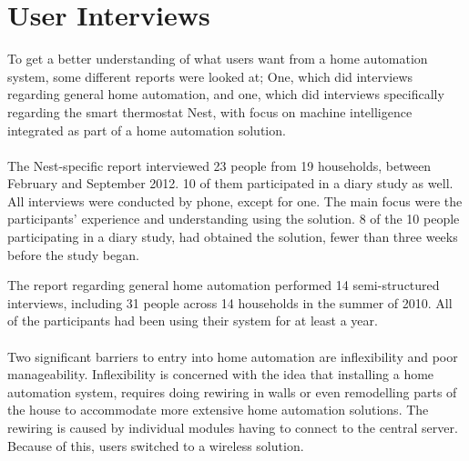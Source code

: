 \section{User Interviews}
\label{sec:interviewReports}
To get a better understanding of what users want from a home automation system, some different reports were looked at; One, which did interviews regarding general home automation\cite{HAInterviews}, and one, which did interviews specifically regarding the smart thermostat Nest, with focus on machine intelligence integrated as part of a home automation solution\cite{AdaptiveInterviews}.
\\\\
The Nest-specific report interviewed 23 people from 19 households, between February and September 2012. 10 of them participated in a diary study as well. All interviews were conducted by phone, except for one. The main focus were the participants' experience and understanding using the solution. 8 of the 10 people participating in a diary study, had obtained the solution, fewer than three weeks before the study began\cite{AdaptiveInterviews}.

The report regarding general home automation performed 14 semi-structured interviews, including 31 people across 14 households in the summer of 2010. All of the participants had been using their system for at least a year\cite{HAInterviews}.
\\\\
Two significant barriers to entry into home automation are inflexibility and poor manageability\cite{HAInterviews}. Inflexibility is concerned with the idea that installing a home automation system, requires doing rewiring in walls or even remodelling parts of the house to accommodate more extensive home automation solutions. The rewiring is caused by individual modules having to connect to the central server. Because of this, users switched to a wireless solution\cite{HAInterviews}.

